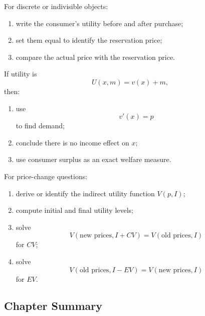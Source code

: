 \begin{examtip}[title={Method Pattern: reservation price questions}]
For discrete or indivisible objects:
\begin{enumerate}
    \item write the consumer's utility before and after purchase;
    \item set them equal to identify the reservation price;
    \item compare the actual price with the reservation price.
\end{enumerate}
\end{examtip}

\begin{examtip}[title={Method Pattern: quasi-linear utility}]
If utility is
\[
U(x,m)=v(x)+m,
\]
then:
\begin{enumerate}
    \item use
    \[
    v'(x)=p
    \]
    to find demand;
    \item conclude there is no income effect on $x$;
    \item use consumer surplus as an exact welfare measure.
\end{enumerate}
\end{examtip}

\begin{examtip}[title={Method Pattern: EV/CV questions}]
For price-change questions:
\begin{enumerate}
    \item derive or identify the indirect utility function $V(p,I)$;
    \item compute initial and final utility levels;
    \item solve
    \[
    V(\text{new prices}, I+CV)=V(\text{old prices}, I)
    \]
    for $CV$;
    \item solve
    \[
    V(\text{old prices}, I-EV)=V(\text{new prices}, I)
    \]
    for $EV$.
\end{enumerate}
\end{examtip}

\subsection{Chapter Summary}


